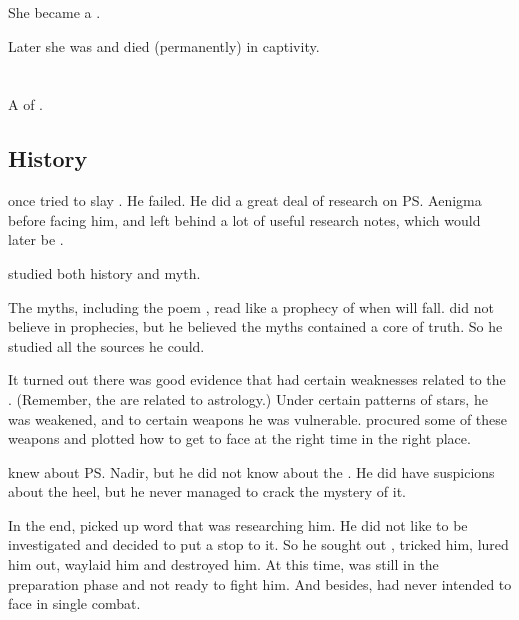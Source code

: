 She became a \Malach.

Later she was  and died (permanently) in captivity. 















\section{\Lothagiel}
\index{\Lothagiel}
A \ketheran{} \resphan{} of \TiphredSerah. 









\subsection{History}
\Lothagiel{} once tried to slay \Ishnaruchaefir{}. 
He failed. 
He did a great deal of research on \ps{\Ishnaruchaefir} Aenigma before facing him, and left behind a lot of useful research notes, which would later be . 

\Lothagiel{} studied both history and myth. 

The myths, including the poem \emph{}, read like a prophecy of when \Ishnaruchaefir{} will fall. 
\Lothagiel{} did not believe in prophecies, but he believed the myths contained a core of truth. 
So he studied all the sources he could. 

It turned out there was good evidence that \Ishnaruchaefir{} had certain  weaknesses related to the . 
(Remember, the \matrices{} are related to astrology.) 
Under certain patterns of stars, he was weakened, and to certain weapons he was vulnerable. 
\Lothagiel{} procured some of these weapons and plotted how to get to face \Ishnaruchaefir{} at the right time in the right place. 

\Lothagiel{} knew about \ps{\Ishnaruchaefir} Nadir, but he did not know about the . 
He did have suspicions about the heel, but he never managed to crack the mystery of it. 

In the end, \Ishnaruchaefir{} picked up word that \Lothagiel{} was researching him. 
He did not like to be investigated and decided to put a stop to it. 
So he sought out \Lothagiel, tricked him, lured him out, waylaid him and destroyed him. 
At this time, \Lothagiel{} was still in the preparation phase and not ready to fight him. 
And besides, \Lothagiel{} had never intended to face \Ishnaruchaefir{} in single combat. 

